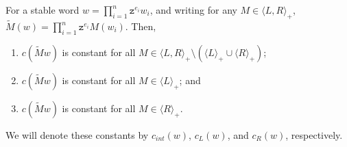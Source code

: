 \documentclass{article}
\begin{document}
	\begin{lemma}\label{lem:cttcanc}
		For a stable word $w=\prod_{i=1}^n\mathtt{z}^{e_i}w_i$, and writing for any $M\in \langle L, R\rangle_+$, $\tilde{M}(w)=\prod_{i=1}^n\mathtt{z}^{e_i}M(w_i)$. Then, 
		\begin{enumerate}
			\item $c(\tilde{M}w)$ is constant for all $M\in \langle L,R \rangle_+\setminus(\langle L\rangle_+ \cup \langle R \rangle_+)$;
			\item  $c(\tilde{M}w)$ is constant for all $M\in\langle L\rangle_+$; and
			\item  $c(\tilde{M}w)$ is constant for all $M\in\langle R\rangle_+$.
		\end{enumerate}
		We will denote these constants by $c_{int}(w)$, $c_L(w)$, and $c_R(w)$, respectively.
	\end{lemma}
\end{document}
